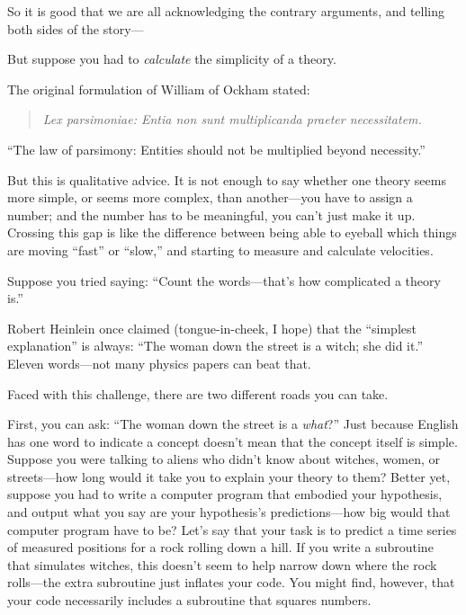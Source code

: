 {
 So it is good that we are all acknowledging the contrary
arguments, and telling both sides of the story---}

{
 But suppose you had to \textit{calculate} the simplicity of a
theory.}

{
 The original formulation of William of Ockham stated:}

\begin{quote}
{
 \textit{Lex parsimoniae: Entia non sunt multiplicanda praeter
   necessitatem.}}
\end{quote}

{
 ``The law of parsimony: Entities should not be
multiplied beyond necessity.''}

{
 But this is qualitative advice. It is not enough to say whether
one theory seems more simple, or seems more complex, than another---you
have to assign a number; and the number has to be meaningful, you
can't just make it up. Crossing this gap is like the
difference between being able to eyeball which things are moving
``fast'' or
``slow,'' and starting to measure
and calculate velocities.}

{
 Suppose you tried saying: ``Count the
words---that's how complicated a theory
is.''}

{
 Robert Heinlein once claimed (tongue-in-cheek, I hope) that the
``simplest explanation'' is always:
``The woman down the street is a witch; she did
it.'' Eleven words---not many physics papers can beat
that.}

{
 Faced with this challenge, there are two different roads you can
take.}

{
 First, you can ask: ``The woman down the street
is a \textit{what}?'' Just because English has one
word to indicate a concept doesn't mean that the
concept itself is simple. Suppose you were talking to aliens who
didn't know about witches, women, or streets---how long
would it take you to explain your theory to them? Better yet, suppose
you had to write a computer program that embodied your hypothesis, and
output what you say are your hypothesis's
predictions---how big would that computer program have to be?
Let's say that your task is to predict a time series of
measured positions for a rock rolling down a hill. If you write a
subroutine that simulates witches, this doesn't seem to
help narrow down where the rock rolls---the extra subroutine just
inflates your code. You might find, however, that your code necessarily
includes a subroutine that squares numbers.}

